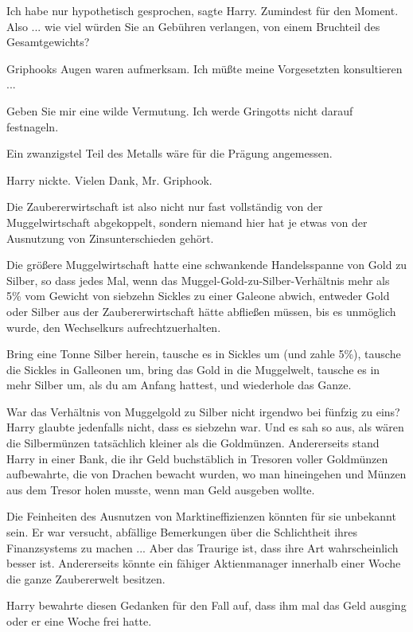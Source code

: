 \glqq{}Ich habe nur hypothetisch gesprochen\grqq{}, sagte Harry. Zumindest für
den Moment. \glqq{}Also ... wie viel würden Sie an Gebühren verlangen, von einem
Bruchteil des Gesamtgewichts?\grqq{}

Griphooks Augen waren aufmerksam. \glqq{}Ich müßte meine Vorgesetzten
konsultieren ...\grqq{}

\glqq{}Geben Sie mir eine wilde Vermutung. Ich werde Gringotts nicht darauf
festnageln.\grqq{}

\glqq{}Ein zwanzigstel Teil des Metalls wäre für die Prägung angemessen.\grqq{}

Harry nickte. \glqq{}Vielen Dank, Mr. Griphook.\grqq{}

Die Zaubererwirtschaft ist also nicht nur fast vollständig von der
Muggelwirtschaft abgekoppelt, sondern niemand hier hat je etwas von der
Ausnutzung von Zinsunterschieden gehört.

Die größere Muggelwirtschaft hatte eine schwankende Handelsspanne von Gold zu
Silber, so dass jedes Mal, wenn das Muggel-Gold-zu-Silber-Verhältnis mehr als
5\% vom Gewicht von siebzehn Sickles zu einer Galeone abwich, entweder Gold oder
Silber aus der Zaubererwirtschaft hätte abfließen müssen, bis es unmöglich
wurde, den Wechselkurs aufrechtzuerhalten.

Bring eine Tonne Silber herein, tausche es in Sickles um (und zahle 5\%),
tausche die Sickles in Galleonen um, bring das Gold in die Muggelwelt, tausche
es in mehr Silber um, als du am Anfang hattest, und wiederhole das Ganze.

War das Verhältnis von Muggelgold zu Silber nicht irgendwo bei fünfzig zu eins?
Harry glaubte jedenfalls nicht, dass es siebzehn war. Und es sah so aus, als
wären die Silbermünzen tatsächlich kleiner als die Goldmünzen. Andererseits
stand Harry in einer Bank, die ihr Geld buchstäblich in Tresoren voller
Goldmünzen aufbewahrte, die von Drachen bewacht wurden, wo man hineingehen und
Münzen aus dem Tresor holen musste, wenn man Geld ausgeben wollte.

Die Feinheiten des Ausnutzen von Marktineffizienzen könnten für sie unbekannt
sein. Er war versucht, abfällige Bemerkungen über die Schlichtheit ihres
Finanzsystems zu machen ... Aber das Traurige ist, dass ihre Art wahrscheinlich
besser ist. Andererseits könnte ein fähiger Aktienmanager innerhalb einer Woche
die ganze Zaubererwelt besitzen.

Harry bewahrte diesen Gedanken für den Fall auf, dass ihm mal das Geld ausging
oder er eine Woche frei hatte.

